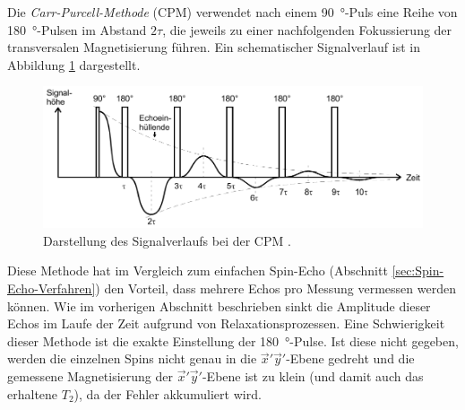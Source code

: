 Die \emph{Carr-Purcell-Methode} (CPM) verwendet nach einem \SI{90}{\degree}-Puls
eine Reihe von \SI{180}{\degree}-Pulsen im Abstand $2 \tau$, die jeweils
zu einer nachfolgenden Fokussierung der transversalen Magnetisierung führen.
Ein schematischer Signalverlauf ist in Abbildung \ref{fig:Carr-Purcell-Methode}
dargestellt.
\begin{figure}
  \centering
  \includegraphics[width=.9\textwidth]{images/carr-purcell.pdf}
  \caption{Darstellung des Signalverlaufs bei der CPM \cite[11]{anleitung}.}
  \label{fig:Carr-Purcell-Methode}
\end{figure}
Diese Methode hat im Vergleich zum einfachen Spin-Echo
(Abschnitt \ref{sec:Spin-Echo-Verfahren}) den Vorteil, dass mehrere
Echos pro Messung vermessen werden können.
Wie im vorherigen Abschnitt beschrieben sinkt die Amplitude dieser Echos im
Laufe der Zeit aufgrund von Relaxationsprozessen.
Eine Schwierigkeit dieser Methode ist die exakte Einstellung der
\SI{180}{\degree}-Pulse.
Ist diese nicht gegeben, werden die einzelnen Spins nicht genau in die
$\vec{x}' \vec{y}'$-Ebene gedreht und die gemessene Magnetisierung
der $\vec{x}' \vec{y}'$-Ebene ist zu klein (und damit auch das erhaltene $T_2$),
da der Fehler akkumuliert wird.


